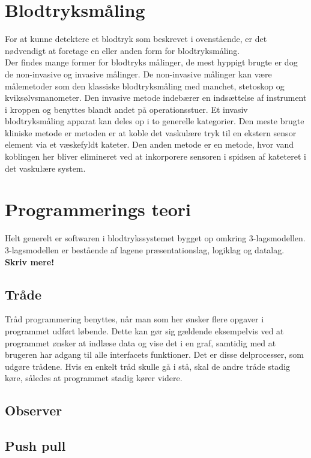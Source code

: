 \section{Blodtryksmåling}
For at kunne detektere et blodtryk som beskrevet i ovenstående, er det nødvendigt at foretage en eller anden form for blodtryksmåling. \\
Der findes mange former for blodtryks målinger, de mest hyppigt brugte er dog de non-invasive og invasive målinger. De non-invasive målinger kan være målemetoder som den klassiske blodtryksmåling med manchet, stetoskop og kviksølvsmanometer. Den invasive metode indebærer en indsættelse af instrument i kroppen og benyttes blandt andet på operationsstuer. Et invasiv blodtryksmåling apparat kan deles op i to generelle kategorier. Den meste brugte kliniske metode er metoden er at koble det vaskulære tryk til en ekstern sensor element via et væskefyldt kateter. Den anden metode er en metode, hvor vand koblingen her bliver elimineret ved at inkorporere sensoren i spidsen af kateteret i det vaskulære system.

\section{Programmerings teori}
Helt generelt er softwaren i blodtrykssystemet bygget op omkring 3-lagsmodellen. 3-lagsmodellen er bestående af lagene præsentationslag, logiklag og datalag. \textbf{Skriv mere!}
\subsection{Tråde}
Tråd programmering benyttes, når man som her ønsker flere opgaver i programmet udført løbende. Dette kan gør sig gældende eksempelvis ved at programmet ønsker at indlæse data og vise det i en graf, samtidig med at brugeren har adgang til alle interfacets funktioner. Det er disse delprocesser, som udgøre trådene. Hvis en enkelt tråd skulle gå i stå, skal de andre tråde stadig køre, således at programmet stadig kører videre. 
\subsection{Observer}
\subsection{Push pull}
